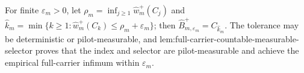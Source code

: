 For finite \(\varepsilon_m>0\), let \(\rho_m=\inf_{j\ge1}\widehat w_m^+(C_j)\) and \(\widehat k_m=\min\{k\ge1:\widehat w_m^+(C_k)\le\rho_m+\varepsilon_m\}\); then \(\widehat B_{m,\varepsilon_m}^+=C_{\widehat k_m}\).  The tolerance may be deterministic or pilot-measurable, and lem:full-carrier-countable-measurable-selector proves that the index and selector are pilot-measurable and achieve the empirical full-carrier infimum within \(\varepsilon_m\).